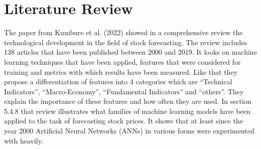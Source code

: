 \documentclass[a4paper,12pt]{report}
\begin{document}
\chapter{Literature Review}
The paper \cite{5} from Kumbure et al. (2022) showed in a comprehensive review the technological development in the field of stock forecasting. The review includes 138 articles that have been published between 2000 and 2019. It looks on machine learning techniques that have been applied, features that were considered for training and metrics with which results have been measured. Like that they propose a differentiation of features into 4 categories which are “Technical Indicators”, “Macro-Economy”, “Fundamental Indicators” and “others”. They explain the importance of these features and how often they are used. In section 5.4.8 that review \cite{5} illustrates what families of machine learning models have been applied to the task of forecasting stock prices. It shows that at least since the year 2000 Artificial Neural Networks (ANNs) in various forms were experimented with heavily. \\
\\\
\end{document}
